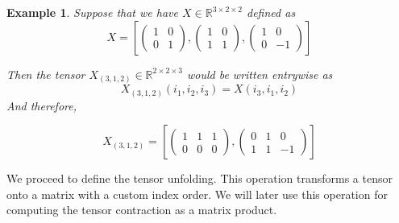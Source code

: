 \documentclass[11pt,a4paper,openright,oneside]{book}
\numberwithin{equation}{section}
\newtheorem{example0}[defn0]{Example}
\newenvironment{example}{ \begin{example0}\rm}{\end{example0}}
\begin{document}
\begin{example}
    Suppose that we have $X \in \mathbb{R}^{3 \times 2 \times 2}$ defined as
    $$X = \left[\begin{pmatrix}
            1 & 0 \\
            0 & 1
        \end{pmatrix}, 
        \begin{pmatrix}
            1 & 0 \\
            1 & 1
        \end{pmatrix},
        \begin{pmatrix}
            1 & 0 \\
            0 & -1
        \end{pmatrix}
        \right]$$

        Then the tensor $X_{(3, 1, 2)} \in \mathbb{R}^{2 \times 2 \times 3}$ would be written entrywise as
        $$X_{(3, 1, 2)}(i_1, i_2, i_3) = X(i_3, i_1, i_2)$$
        And therefore,

        $$X_{(3,1,2)} = \left[\begin{pmatrix} 1 & 1 & 1 \\ 0 & 0 & 0  \end{pmatrix}, \begin{pmatrix}  0 & 1 & 0 \\ 1 & 1 & -1 \end{pmatrix} \right]$$ 


    \label{ex:perm}
\end{example}

We proceed to define the tensor unfolding. This operation transforms a tensor onto a matrix with a custom index order. 
We will later use this operation for computing the tensor contraction as a matrix product.
\end{document}
